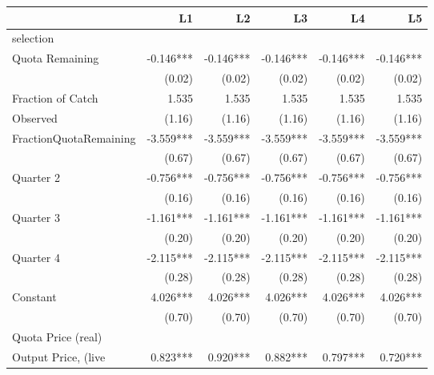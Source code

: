 {
\def\sym#1{\ifmmode^{#1}\else\(^{#1}\)\fi}
\begin{tabular}{l*{5}{r}}
\hline\hline
                    &          L1   &          L2   &          L3   &          L4   &          L5   \\
\hline
selection           &               &               &               &               &               \\
Quota Remaining     &      -0.146***&      -0.146***&      -0.146***&      -0.146***&      -0.146***\\
                    &      (0.02)   &      (0.02)   &      (0.02)   &      (0.02)   &      (0.02)   \\
Fraction of Catch   &       1.535   &       1.535   &       1.535   &       1.535   &       1.535   \\
Observed            &      (1.16)   &      (1.16)   &      (1.16)   &      (1.16)   &      (1.16)   \\
FractionQuotaRemaining&      -3.559***&      -3.559***&      -3.559***&      -3.559***&      -3.559***\\
                    &      (0.67)   &      (0.67)   &      (0.67)   &      (0.67)   &      (0.67)   \\
Quarter 2           &      -0.756***&      -0.756***&      -0.756***&      -0.756***&      -0.756***\\
                    &      (0.16)   &      (0.16)   &      (0.16)   &      (0.16)   &      (0.16)   \\
Quarter 3           &      -1.161***&      -1.161***&      -1.161***&      -1.161***&      -1.161***\\
                    &      (0.20)   &      (0.20)   &      (0.20)   &      (0.20)   &      (0.20)   \\
Quarter 4           &      -2.115***&      -2.115***&      -2.115***&      -2.115***&      -2.115***\\
                    &      (0.28)   &      (0.28)   &      (0.28)   &      (0.28)   &      (0.28)   \\
Constant               &       4.026***&       4.026***&       4.026***&       4.026***&       4.026***\\
                    &      (0.70)   &      (0.70)   &      (0.70)   &      (0.70)   &      (0.70)   \\
\hline
Quota Price (real)  &               &               &               &               &               \\
Output Price, (live &       0.823***&       0.920***&       0.882***&       0.797***&       0.720***\\

\end{tabular}}
